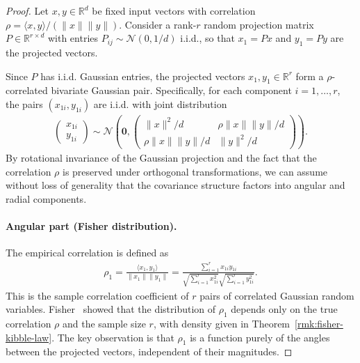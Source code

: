 \begin{proof}
\label{proof:fisher_kibble}
Let \(x, y \in \mathbb{R}^d\) be fixed input vectors with correlation \(\rho = \langle x, y\rangle/(\|x\|\|y\|)\). Consider a rank-\(r\) random projection matrix \(P \in \mathbb{R}^{r \times d}\) with entries \(P_{ij} \sim \mathcal{N}(0, 1/d)\) i.i.d., so that \(x_1 = Px\) and \(y_1 = Py\) are the projected vectors.

Since \(P\) has i.i.d. Gaussian entries, the projected vectors \(x_1, y_1 \in \mathbb{R}^r\) form a \(\rho\)-correlated bivariate Gaussian pair. Specifically, for each component \(i = 1, \dots, r\), the pairs \((x_{1i}, y_{1i})\) are i.i.d. with joint distribution
\begin{align}
\begin{pmatrix} x_{1i} \\ y_{1i} \end{pmatrix} \sim \mathcal{N}\left(\mathbf{0}, \begin{pmatrix} \|x\|^2/d & \rho \|x\|\|y\|/d \\ \rho \|x\|\|y\|/d & \|y\|^2/d \end{pmatrix}\right).
\end{align}
By rotational invariance of the Gaussian projection and the fact that the correlation \(\rho\) is preserved under orthogonal transformations, we can assume without loss of generality that the covariance structure factors into angular and radial components.

\paragraph{Angular part (Fisher distribution).}
The empirical correlation is defined as
\begin{align}
\rho_1 = \frac{\langle x_1, y_1 \rangle}{\|x_1\|\|y_1\|} = \frac{\sum_{i=1}^r x_{1i} y_{1i}}{\sqrt{\sum_{i=1}^r x_{1i}^2}\sqrt{\sum_{i=1}^r y_{1i}^2}}.
\end{align}
This is the sample correlation coefficient of \(r\) pairs of correlated Gaussian random variables. Fisher~\cite{fisher1915probable,hotelling1953new} showed that the distribution of \(\rho_1\) depends only on the true correlation \(\rho\) and the sample size \(r\), with density given in Theorem~\ref{rmk:fisher-kibble-law}. The key observation is that \(\rho_1\) is a function purely of the angles between the projected vectors, independent of their magnitudes.


\end{proof}
